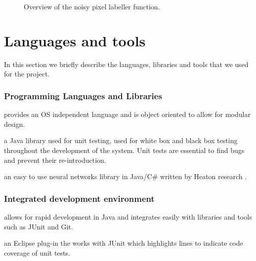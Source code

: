 \documentclass[12pt,twoside,notitlepage]{report}
\begin{document}
\begin{figure}[H]
{\begin{tikzpicture}[node distance=2cm,>=stealth',bend angle=45,auto]
                                    
                            \end{tikzpicture}
                        }

                    \caption{Overview of the noisy pixel labeller function.}
                \end{figure} 







    \section{Languages and tools}
        In this section we briefly describe the languages, libraries and tools that we used for the project.

        \subsubsection{Programming Languages and Libraries}
            \begin{description}[font=\normalfont\itshape, labelindent=10pt]
                \item[Java:] provides an OS independent language and is object oriented to allow for modular design.
                \item[JUnit:] a Java library used for unit testing, used for white box and black box testing throughout 
                    the development of the system. Unit tests are essential to find bugs and prevent their re-introduction.
                \item[Encog:] an easy to use neural networks library in Java/C\# written by Heaton research \cite{JMLR:v16:heaton15a}. 
            \end{description}

        \subsubsection{Integrated development environment}
            \begin{description}[font=\normalfont\itshape, labelindent=10pt]
                \item[Eclipse:] allows for rapid development in Java and integrates easily with libraries and tools such 
                    as JUnit and Git.
                \item[EclEmma:] an Eclipse plug-in the works with JUnit which highlights lines to indicate code coverage 
                    of unit tests.
            \end{description}
\end{document}
